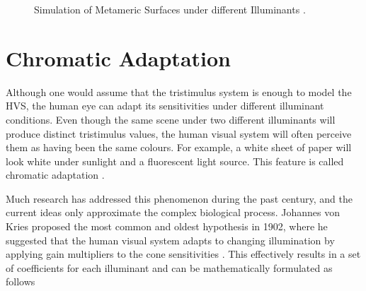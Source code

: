 \begin{figure}
    \centering
    \caption{Simulation of Metameric Surfaces under different Illuminants \cite{metamerism}.}
    \label{fig:metamerism}
\end{figure}

\section{Chromatic Adaptation}
\label{sec:chromaticadaptation}
Although one would assume that the tristimulus system is enough to model the HVS, the human eye can adapt its sensitivities under different illuminant conditions. Even though the same scene under two different illuminants will produce distinct tristimulus values, the human visual system will often perceive them as having been the same colours. For example, a white sheet of paper will look white under sunlight and a fluorescent light source. This feature is called chromatic adaptation \cite[146-149]{fairchild}.

Much research has addressed this phenomenon during the past century, and the current ideas only approximate the complex biological process. Johannes von Kries proposed the most common and oldest hypothesis in 1902, where he suggested that the human visual system adapts to changing illumination by applying gain multipliers to the cone sensitivities \cite[168-171]{fairchild}. This effectively results in a set of coefficients for each illuminant and can be mathematically formulated as follows

